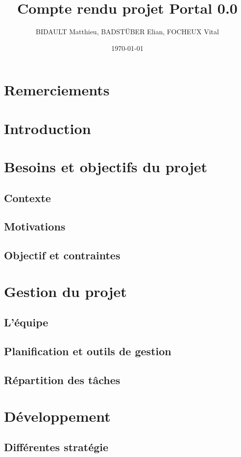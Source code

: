 \documentclass[12pt]{report}
\title{Compte rendu projet Portal 0.0}
\author{BIDAULT Matthieu, BADSTÜBER Elian, FOCHEUX Vital}
\date{\today}
\begin{document}
\maketitle

\section*{Remerciements}

\tableofcontents

\section{Introduction}

\section{Besoins et objectifs du projet}
\subsection{Contexte}
\subsection{Motivations}
\subsection{Objectif et contraintes}

\section{Gestion du projet}
\subsection{L'équipe}
\subsection{Planification et outils de gestion}
\subsection{Répartition des tâches}

\section{Développement}
\subsection{Différentes stratégie}
\end{document}
